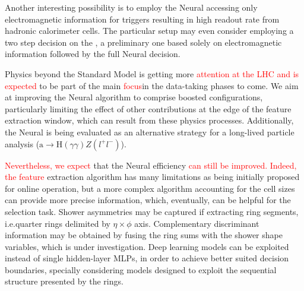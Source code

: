 
Another interesting possibility is to employ the Neural\rnn{} accessing only
electromagnetic information for triggers resulting in high readout rate from
hadronic calorimeter cells. The particular setup may even consider employing a
two step decision on the \fastcalo{}, a preliminary one based solely on
electromagnetic information followed by the full Neural\rnn{} decision.




Physics beyond the Standard Model is getting more \textcolor{red}{attention at the LHC  and is expected} to be part of the main \textcolor{red}{focus}in the data-taking phases to
come. We aim at improving the Neural\rnn{} algorithm to comprise boosted
configurations, particularly limiting the effect of other contributions at
the edge of the feature extraction window, which can result from these physics
processes. Additionally, the Neural\rnn{} is being evaluated as an alternative
strategy for a long-lived particle analysis
($\text{a}\rightarrow\text{H}(\gamma\gamma)Z(l^+l^-)$).

\textcolor{red}{Nevertheless, we expect}
that the Neural\rnn{} efficiency \textcolor{red}{can still be improved. Indeed, the feature} extraction
algorithm has many limitations as being initially proposed for online
operation, but a more complex algorithm accounting for the cell sizes can
provide more precise information, which, eventually, can be helpful for the
selection task. Shower asymmetries may be captured if extracting ring segments,
i.e.\@ quarter rings delimited by $\eta\times\phi$ axis. Complementary
discriminant information may be obtained by fusing the ring sums with the shower shape variables,
which is under investigation. Deep learning models can be exploited instead of
single hidden-layer MLPs, in order to achieve better suited decision boundaries,
specially considering models designed to exploit the sequential structure
presented by the rings.



